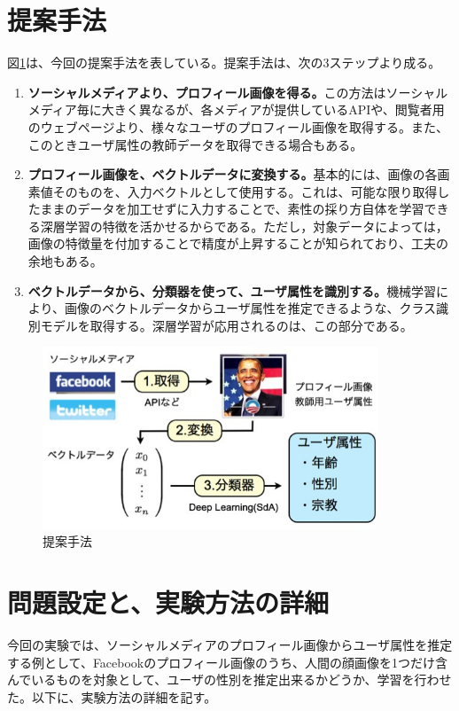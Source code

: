 \section{提案手法}
図\ref{c7_proposal}は、今回の提案手法を表している。提案手法は、次の3ステップより成る。
\begin{enumerate}
\item \textbf{ソーシャルメディアより、プロフィール画像を得る。}この方法はソーシャルメディア毎に大きく異なるが、各メディアが提供しているAPIや、閲覧者用のウェブページより、様々なユーザのプロフィール画像を取得する。また、このときユーザ属性の教師データを取得できる場合もある。
\item \textbf{プロフィール画像を、ベクトルデータに変換する。}基本的には、画像の各画素値そのものを、入力ベクトルとして使用する。これは、可能な限り取得したままのデータを加工せずに入力することで、素性の採り方自体を学習できる深層学習の特徴を活かせるからである。ただし，対象データによっては，画像の特徴量を付加することで精度が上昇する\cite{ciresan2012multi-column}ことが知られており、工夫の余地もある。
\item \textbf{ベクトルデータから、分類器を使って、ユーザ属性を識別する。}機械学習により、画像のベクトルデータからユーザ属性を推定できるような、クラス識別モデルを取得する。深層学習が応用されるのは、この部分である。
\end{enumerate}


\begin{figure}[tbp]
 \begin{center}
  \includegraphics[width=100mm]{img/c7/proposal}
 \end{center}
 \caption{提案手法}
 \label{c7_proposal}
\end{figure}

\section{問題設定と、実験方法の詳細}
今回の実験では、ソーシャルメディアのプロフィール画像からユーザ属性を推定する例として、Facebookのプロフィール画像のうち、人間の顔画像を1つだけ含んでいるものを対象として、ユーザの性別を推定出来るかどうか、学習を行わせた。以下に、実験方法の詳細を記す。
